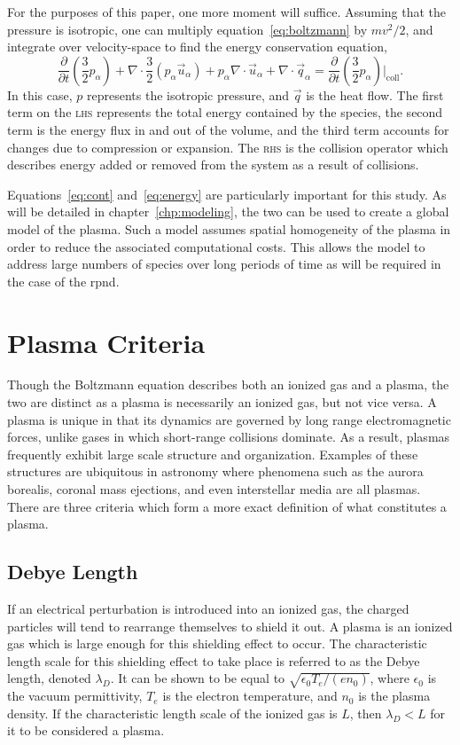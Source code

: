 For the purposes of this paper, one more moment will suffice. Assuming that the
pressure is isotropic, one can multiply equation~\ref{eq:boltzmann} by $mv^2/2$,
and integrate over velocity-space to find the energy conservation equation,
\begin{equation}
  \frac{\partial}{\partial t}\left(\frac{3}{2}p_\alpha\right) 
  + \nabla\cdot\frac{3}{2} (p_\alpha\vec{u}_\alpha)
  + p_\alpha\nabla\cdot\vec{u}_\alpha
  + \nabla\cdot\vec{q}_\alpha
  = \frac{\partial}{\partial
  t}\left(\frac{3}{2}p_\alpha\right)\bigg|_\mathrm{coll}.
  \label{eq:energy}
\end{equation}
In this case, $p$ represents the isotropic pressure, and $\vec{q}$ is the heat
flow. The first term on the \textsc{lhs} represents the total energy contained
by the species, the second term is the energy flux in and out of the volume, and
the third term accounts for changes due to compression or expansion. The
\textsc{rhs} is the collision operator which describes energy added or removed
from the system as a result of collisions.

Equations~\ref{eq:cont} and~\ref{eq:energy} are particularly important for this
study. As will be detailed in chapter~\ref{chp:modeling}, the two can be used to
create a global model of the plasma. Such a model assumes spatial homogeneity of
the plasma in order to reduce the associated computational costs. This allows
the model to address large numbers of species over long periods of time as will
be required in the case of the \acs{rpnd}.

\section{Plasma Criteria}
Though the Boltzmann equation describes both an ionized gas and a plasma, the
two are distinct as a plasma is necessarily an ionized gas, but not vice versa.
A plasma is unique in that its dynamics are governed by long range
electromagnetic forces, unlike gases in which short-range collisions dominate.
As a result, plasmas frequently exhibit large scale structure and organization.
Examples of these structures are ubiquitous in astronomy where phenomena such as
the aurora borealis, coronal mass ejections, and even interstellar media are all
plasmas. There are three criteria which form a more exact definition of what
constitutes a plasma.

\subsection{Debye Length}
If an electrical perturbation is introduced into an ionized gas, the charged
particles will tend to rearrange themselves to shield it out. A plasma is an
ionized gas which is large enough for this shielding effect to occur. The
characteristic length scale for this shielding effect to take place is referred
to as the Debye length, denoted $\lambda_D$. It can be shown to be equal to
$\sqrt{\epsilon_0T_e/(en_0)}$, where $\epsilon_0$ is the vacuum permittivity,
$T_e$ is the electron temperature, and $n_0$ is the plasma density. If the
characteristic length scale of the ionized gas is $L$, then $\lambda_D < L$ for
it to be considered a plasma.

